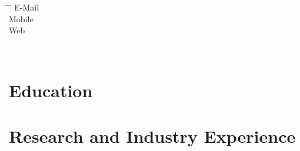 \documentclass[12pt]{report} %
\begin{document}






\begin{minipage}{0.45\textwidth}
\begin{tabbing}
\hspace{3cm} \= \hspace{4cm} \= \kill %
E-Mail  \> \href{mailto:\varEmail}{\varEmail} \\
Mobile  \> \varMobile \\
\DoIfNotEmpty{\varWeb}
{Web \> \href{\varWeb}{\varWeb} \\}%
\end{tabbing}
\end{minipage}%
\hfill
\begin{minipage}{0.3\textwidth}%
\varAddress \\%
\end{minipage}%



\section{Education}

\education{}



\section{Research and Industry Experience}
\professional{}


\end{document}
